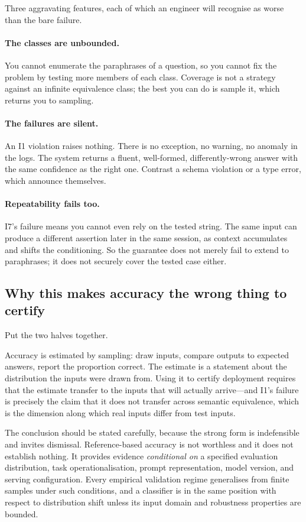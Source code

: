 Three aggravating features, each of which an engineer will recognise as worse than
the bare failure.

\paragraph{The classes are unbounded.} You cannot enumerate the paraphrases of a
question, so you cannot fix the problem by testing more members of each class.
Coverage is not a strategy against an infinite equivalence class; the best you can
do is sample it, which returns you to sampling.

\paragraph{The failures are silent.} An I1 violation raises nothing. There is no
exception, no warning, no anomaly in the logs. The system returns a fluent,
well-formed, differently-wrong answer with the same confidence as the right one.
Contrast a schema violation or a type error, which announce themselves.

\paragraph{Repeatability fails too.} I7's failure means you cannot even rely on
the tested string. The same input can produce a different assertion later in the
same session, as context accumulates and shifts the conditioning. So the guarantee
does not merely fail to extend to paraphrases; it does not securely cover the
tested case either.

\subsection{Why this makes accuracy the wrong thing to certify}

Put the two halves together.

Accuracy is estimated by sampling: draw inputs, compare outputs to expected
answers, report the proportion correct. The estimate is a statement about the
distribution the inputs were drawn from. Using it to certify deployment requires
that the estimate transfer to the inputs that will actually arrive---and I1's
failure is precisely the claim that it does not transfer across semantic
equivalence, which is the dimension along which real inputs differ from test
inputs.

The conclusion should be stated carefully, because the strong form is indefensible and
invites dismissal. Reference-based accuracy is not worthless and it does not establish
nothing. It provides evidence \emph{conditional on} a specified evaluation
distribution, task operationalisation, prompt representation, model version, and serving
configuration. Every empirical validation regime generalises from finite samples under
such conditions, and a classifier is in the same position with respect to distribution
shift unless its input domain and robustness properties are bounded.

